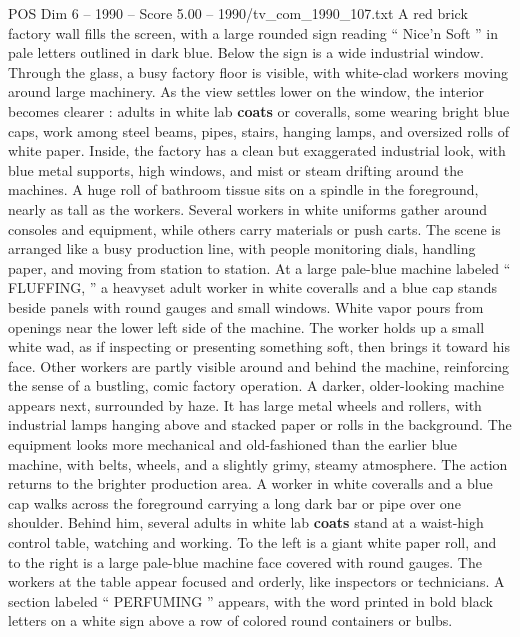 \begin{textsample}{POS Dim 6 – 1990 – Score 5.00 – 1990/tv\_com\_1990\_107.txt}  \label{ex:f6_pos_079}
A red brick factory wall fills the screen, with a large rounded sign reading “ Nice’n Soft ” in pale letters outlined in dark blue.
Below the sign is a wide industrial window.
Through the glass, a busy factory floor is visible, with white-clad workers moving around large machinery.
As the view settles lower on the window, the interior becomes clearer : adults in white lab \textbf{coats} or coveralls, some wearing bright blue caps, work among steel beams, pipes, stairs, hanging lamps, and oversized rolls of white paper.
Inside, the factory has a clean but exaggerated industrial look, with blue metal supports, high windows, and mist or steam drifting around the machines.
A huge roll of bathroom tissue sits on a spindle in the foreground, nearly as tall as the workers.
Several workers in white uniforms gather around consoles and equipment, while others carry materials or push carts.
The scene is arranged like a busy production line, with people monitoring dials, handling paper, and moving from station to station.
At a large pale-blue machine labeled “ FLUFFING, ” a heavyset adult worker in white coveralls and a blue cap stands beside panels with round gauges and small windows.
White vapor pours from openings near the lower left side of the machine.
The worker holds up a small white wad, as if inspecting or presenting something soft, then brings it toward his face.
Other workers are partly visible around and behind the machine, reinforcing the sense of a bustling, comic factory operation.
A darker, older-looking machine appears next, surrounded by haze.
It has large metal wheels and rollers, with industrial lamps hanging above and stacked paper or rolls in the background.
The equipment looks more mechanical and old-fashioned than the earlier blue machine, with belts, wheels, and a slightly grimy, steamy atmosphere.
The action returns to the brighter production area.
A worker in white coveralls and a blue cap walks across the foreground carrying a long dark bar or pipe over one shoulder.
Behind him, several adults in white lab \textbf{coats} stand at a waist-high control table, watching and working.
To the left is a giant white paper roll, and to the right is a large pale-blue machine face covered with round gauges.
The workers at the table appear focused and orderly, like inspectors or technicians.
A section labeled “ PERFUMING ” appears, with the word printed in bold black letters on a white sign above a row of colored round containers or bulbs.

\end{textsample}
